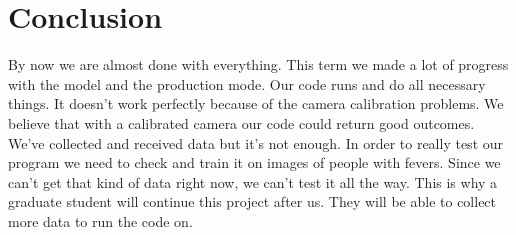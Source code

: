 \documentclass[onecolumn, draftclsnofoot,10pt, compsoc]{IEEEtran}
\begin{document}
\section{Conclusion}


By now we are almost done with everything. This term we made a lot of progress with the model and the production mode. Our code runs and do all necessary things. It doesn’t work perfectly because of the camera calibration problems. We believe that with a calibrated camera our code could return good outcomes. We’ve collected and received data but it’s not enough. In order to really test our program we need to check and train it on images of people with fevers. Since we can’t get that kind of data right now, we can’t test it all the way. This is why a graduate student will continue this project after us. They will be able to collect more data to run the code on. 








\end{document}
